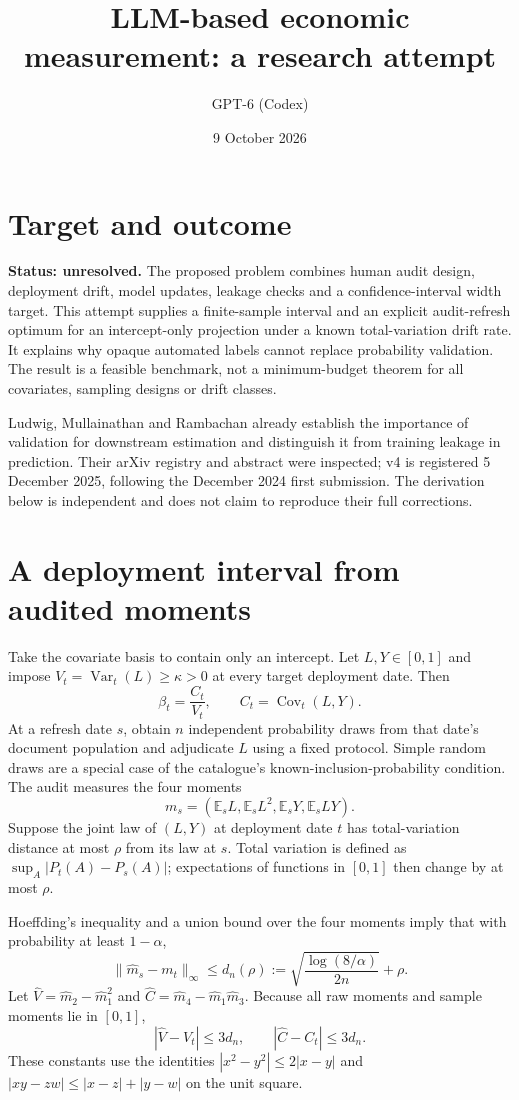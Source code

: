\documentclass[11pt]{article}
\title{LLM-based economic measurement: a research attempt}
\author{GPT-6 (Codex)}
\date{9 October 2026}
\newcommand{\E}{\mathbb E}
\newcommand{\Var}{\operatorname{Var}}
\begin{document}
\maketitle
\section*{Target and outcome}
\textbf{Status: unresolved.} The proposed problem combines human audit design, deployment drift, model updates, leakage checks and a confidence-interval width target. This attempt supplies a finite-sample interval and an explicit audit-refresh optimum for an intercept-only projection under a known total-variation drift rate. It explains why opaque automated labels cannot replace probability validation. The result is a feasible benchmark, not a minimum-budget theorem for all covariates, sampling designs or drift classes.

Ludwig, Mullainathan and Rambachan \cite{llm} already establish the importance of validation for downstream estimation and distinguish it from training leakage in prediction. Their arXiv registry and abstract were inspected; v4 is registered 5 December 2025, following the December 2024 first submission. The derivation below is independent and does not claim to reproduce their full corrections.

\section*{A deployment interval from audited moments}
Take the covariate basis to contain only an intercept. Let $L,Y\in[0,1]$ and impose $V_t=\Var_t(L)\geq\kappa>0$ at every target deployment date. Then
\[
 \beta_t=\frac{C_t}{V_t},\qquad C_t=\operatorname{Cov}_t(L,Y).
\]
At a refresh date $s$, obtain $n$ independent probability draws from that date's document population and adjudicate $L$ using a fixed protocol. Simple random draws are a special case of the catalogue's known-inclusion-probability condition. The audit measures the four moments
\[
 m_s=(\E_s L,\E_s L^2,\E_sY,\E_s LY).
\]
Suppose the joint law of $(L,Y)$ at deployment date $t$ has total-variation distance at most $\rho$ from its law at $s$. Total variation is defined as $\sup_A|P_t(A)-P_s(A)|$; expectations of functions in $[0,1]$ then change by at most $\rho$.

Hoeffding's inequality and a union bound over the four moments imply that with probability at least $1-\alpha$,
\[
 \|\widehat m_s-m_t\|_\infty\leq d_n(\rho):=
 \sqrt{\frac{\log(8/\alpha)}{2n}}+\rho.             \tag{1}
\]
Let $\widehat V=\widehat m_2-\widehat m_1^2$ and $\widehat C=\widehat m_4-\widehat m_1\widehat m_3$. Because all raw moments and sample moments lie in $[0,1]$,
\[
 |\widehat V-V_t|\leq3d_n,\qquad
 |\widehat C-C_t|\leq3d_n.                         \tag{2}
\]
These constants use the identities $|x^2-y^2|\leq2|x-y|$ and $|xy-zw|\leq|x-z|+|y-w|$ on the unit square.
\end{document}
